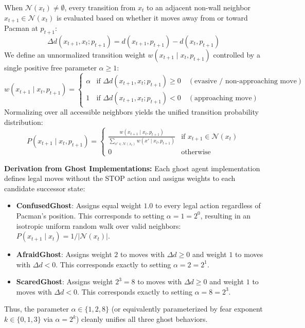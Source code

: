 \documentclass{article}
\begin{document}
\begin{enumerate}[label=\alph*.,leftmargin=*]
    When $\mathcal{N}(x_t) \neq \emptyset$, every transition from $x_t$ to an adjacent non-wall neighbor $x_{t+1} \in \mathcal{N}(x_t)$ is evaluated based on whether it moves away from or toward Pacman at $p_{t+1}$:
    \begin{equation}
        \Delta d(x_{t+1}, x_t; p_{t+1}) = d(x_{t+1}, p_{t+1}) - d(x_t, p_{t+1})
    \end{equation}
    We define an unnormalized transition weight $w(x_{t+1} \mid x_t, p_{t+1})$ controlled by a single positive free parameter $\alpha \ge 1$:
    \begin{equation}
        w(x_{t+1} \mid x_t, p_{t+1}) = \begin{cases}
            \alpha & \text{if } \Delta d(x_{t+1}, x_t; p_{t+1}) \ge 0 \quad (\text{evasive / non-approaching move}) \\
            1      & \text{if } \Delta d(x_{t+1}, x_t; p_{t+1}) < 0 \quad (\text{approaching move})
        \end{cases}
    \end{equation}
    Normalizing over all accessible neighbors yields the unified transition probability distribution:
    \begin{equation}
        P(x_{t+1} \mid x_t, p_{t+1}) = \begin{cases}
            \displaystyle \frac{w(x_{t+1} \mid x_t, p_{t+1})}{\sum_{x' \in \mathcal{N}(x_t)} w(x' \mid x_t, p_{t+1})} & \text{if } x_{t+1} \in \mathcal{N}(x_t) \\
            0 & \text{otherwise}
        \end{cases}
    \end{equation}

    \textbf{Derivation from Ghost Implementations:}
    Each ghost agent implementation defines legal moves without the STOP action and assigns weights to each candidate successor state:
    \begin{itemize}[leftmargin=*,noitemsep]
        \item \textbf{ConfusedGhost}: Assigns equal weight $1.0$ to every legal action regardless of Pacman's position. This corresponds to setting $\alpha = 1 = 2^0$, resulting in an isotropic uniform random walk over valid neighbors: $P(x_{t+1} \mid x_t) = 1 / |\mathcal{N}(x_t)|$.
        \item \textbf{AfraidGhost}: Assigns weight $2$ to moves with $\Delta d \ge 0$ and weight $1$ to moves with $\Delta d < 0$. This corresponds exactly to setting $\alpha = 2 = 2^1$.
        \item \textbf{ScaredGhost}: Assigns weight $2^3 = 8$ to moves with $\Delta d \ge 0$ and weight $1$ to moves with $\Delta d < 0$. This corresponds exactly to setting $\alpha = 8 = 2^3$.
    \end{itemize}
    Thus, the parameter $\alpha \in \{1, 2, 8\}$ (or equivalently parameterized by fear exponent $k \in \{0, 1, 3\}$ via $\alpha = 2^k$) cleanly unifies all three ghost behaviors.


\end{enumerate}
\end{document}
